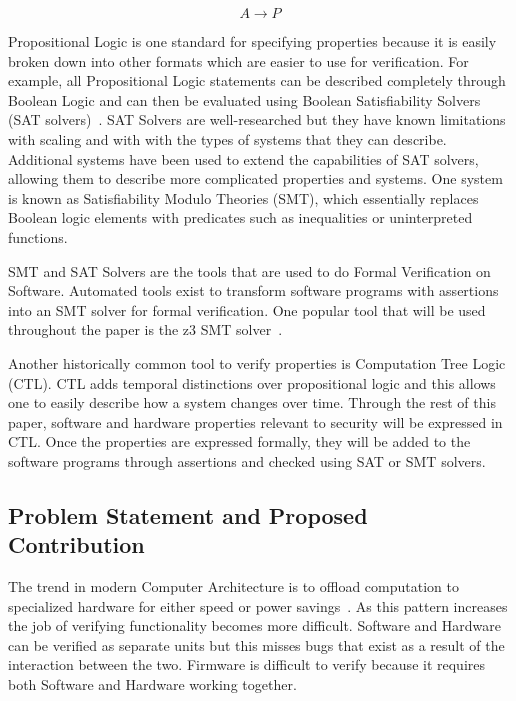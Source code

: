 \documentclass[../report.tex]{subfiles}
\begin{document}
\begin{equation}
    A \to P
\end{equation}

Propositional Logic is one standard for specifying properties because it is easily
broken down into other formats which are easier to use for verification.
For example, all Propositional Logic statements can be described completely
through Boolean Logic and can then be evaluated using Boolean Satisfiability
Solvers (SAT solvers)~\cite{validating-sat}. SAT Solvers are well-researched but
they have known limitations with scaling and with with the types of systems that
they can describe.
Additional systems have been used to extend the capabilities of SAT solvers, allowing them to describe more complicated properties and systems. 
One system is known as Satisfiability Modulo Theories (SMT), which essentially replaces Boolean logic elements with predicates such as inequalities or uninterpreted functions. 

SMT and SAT Solvers are the tools that are used to do Formal Verification
on Software. Automated tools exist to transform software programs with
assertions into an SMT solver for formal verification. 
One popular tool that will be used throughout the paper is the z3 SMT solver~\cite{z3-smt-solver}.

Another historically common tool to verify properties is Computation Tree Logic (CTL).
CTL adds temporal distinctions over propositional logic and this allows one to easily describe how a system changes over time.
Through the rest of this paper, software and hardware properties relevant to security will be expressed in CTL\@. 
Once the properties are expressed formally, they will be added to the software programs through assertions and checked using SAT or SMT solvers.



\subsection{Problem Statement and Proposed Contribution}

The trend in modern Computer Architecture is to offload computation to specialized hardware for either speed or power savings~\cite{hardware-accel}.
As this pattern increases the job of verifying functionality becomes more difficult.
Software and Hardware can be verified as separate units but this misses bugs
that exist as a result of the interaction between the two.
Firmware is difficult to verify because it requires both Software and Hardware
working together.
\end{document}
